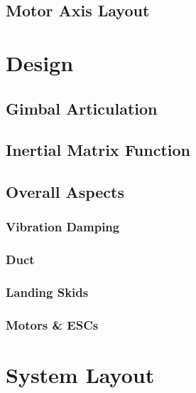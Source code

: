 \subsection{Motor Axis Layout}
\label{subsec:proto.conventions.motoraxis}

\section{Design}
\label{sec:proto.design}
\subsection{Gimbal Articulation}
\label{subsec:proto.design.actuation}
\subsection{Inertial Matrix Function}
\label{subsec:proto.design.inertia}
\subsection{Overall Aspects}
\label{subsec:proto.design.aspects}
\subsubsection{Vibration Damping}
\subsubsection{Duct}
\subsubsection{Landing Skids}
\subsubsection{Motors \& ESCs}

\section{System Layout}
\label{sec:proto.layout}
